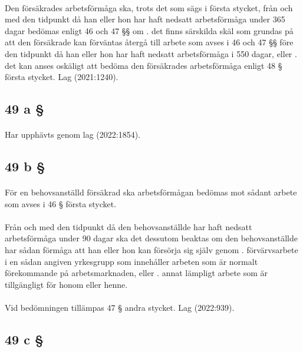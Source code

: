 \documentclass[a4paper,notitlepage,openany,10pt]{book}
\begin{document}
\paragraph*{}
Den försäkrades arbetsförmåga ska, trots det som sägs i första stycket, från och med den tidpunkt då han eller hon har haft nedsatt arbetsförmåga under 365 dagar bedömas enligt 46 och 47 §§ om
. det finns särskilda skäl som grundas på att den försäkrade kan förväntas återgå till arbete som avses i 46 och 47 §§ före den tidpunkt då han eller hon har haft nedsatt arbetsförmåga i 550 dagar, eller
. det kan anses oskäligt att bedöma den försäkrades arbetsförmåga enligt 48 § första stycket.
Lag (2021:1240).
\subsection*{49 a §}
\paragraph*{}
Har upphävts genom
lag (2022:1854).
\subsection*{49 b §}
\paragraph*{}
För en behovsanställd försäkrad ska arbetsförmågan bedömas mot sådant arbete som avses i 46 § första stycket.
\paragraph*{}
Från och med den tidpunkt då den behovsanställde har haft nedsatt arbetsförmåga under 90 dagar ska det dessutom beaktas om den behovsanställde har sådan förmåga att han eller hon kan försörja sig själv genom
. förvärvsarbete i en sådan angiven yrkesgrupp som innehåller arbeten som är normalt förekommande på arbetsmarknaden, eller
. annat lämpligt arbete som är tillgängligt för honom eller henne.
\paragraph*{}
Vid bedömningen tillämpas 47 § andra stycket.
Lag (2022:939).
\subsection*{49 c §}
\end{document}

